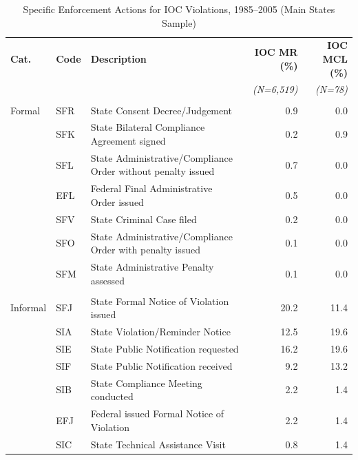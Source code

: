 \clearpage




\begin{table}[htbp]
\centering
\caption{Specific Enforcement Actions for IOC Violations, 1985--2005 (Main States Sample)}
\label{tab:enf_action_type_ioc_mainstates}
\small
\begin{tabular}{llp{6.5cm}rr}
\hline\hline
\textbf{Cat.} & \textbf{Code} & \textbf{Description} & \textbf{IOC MR (\%)} & \textbf{IOC MCL (\%)} \\
 & & & \textit{(N=6,519)} & \textit{(N=78)} \\
\hline
\addlinespace[4pt]
\multicolumn{5}{l}{\textit{Formal enforcement}} \\
\addlinespace[2pt]
Formal & SFR & State Consent Decree/Judgement & 0.9 & 0.0 \\
 & SFK & State Bilateral Compliance Agreement signed & 0.2 & 0.9 \\
 & SFL & State Administrative/Compliance Order without penalty issued & 0.7 & 0.0 \\
 & EFL & Federal Final Administrative Order issued & 0.5 & 0.0 \\
 & SFV & State Criminal Case filed & 0.2 & 0.0 \\
 & SFO & State Administrative/Compliance Order with penalty issued & 0.1 & 0.0 \\
 & SFM & State Administrative Penalty assessed & 0.1 & 0.0 \\
\addlinespace[4pt]
\multicolumn{5}{l}{\textit{Informal enforcement}} \\
\addlinespace[2pt]
Informal & SFJ & State Formal Notice of Violation issued & 20.2 & 11.4 \\
 & SIA & State Violation/Reminder Notice & 12.5 & 19.6 \\
 & SIE & State Public Notification requested & 16.2 & 19.6 \\
 & SIF & State Public Notification received & 9.2 & 13.2 \\
 & SIB & State Compliance Meeting conducted & 2.2 & 1.4 \\
 & EFJ & Federal issued Formal Notice of Violation & 2.2 & 1.4 \\
 & SIC & State Technical Assistance Visit & 0.8 & 1.4 \\

\end{tabular}
\end{table}
